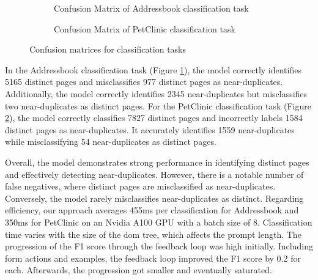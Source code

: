         \begin{figure}[ht]
          \centering
          \begin{subfigure}[b]{0.48\textwidth}
            
            \caption{Confusion Matrix of Addressbook classification task}
            \label{fig:conv_address}
          \end{subfigure}
          \hfill
          \begin{subfigure}[b]{0.48\textwidth}
            
            \caption{Confusion Matrix of PetClinic classification task}
            \label{fig:conf_pet}
          \end{subfigure}
          \caption{Confusion matrices for classification tasks}
          \label{fig:both_matrices}
        \end{figure}

        In the Addressbook classification task (Figure \ref{fig:conv_address}), the model correctly identifies 5165 distinct pages and misclassifies 977 distinct pages as near-duplicates. Additionally, the model correctly identifies 2345 near-duplicates but misclassifies two near-duplicates as distinct pages. For the PetClinic classification task (Figure \ref{fig:conf_pet}), the model correctly classifies 7827 distinct pages and incorrectly labels 1584 distinct pages as near-duplicates. It accurately identifies 1559 near-duplicates while misclassifying 54 near-duplicates as distinct pages.

        Overall, the model demonstrates strong performance in identifying distinct pages and effectively detecting near-duplicates. However, there is a notable number of false negatives, where distinct pages are misclassified as near-duplicates. Conversely, the model rarely misclassifies near-duplicates as distinct. Regarding efficiency, our approach averages 455ms per classification for Addressbook and 350ms for PetClinic on an Nvidia A100 GPU with a batch size of 8. Classification time varies with the size of the \ac{dom} tree, which affects the prompt length. The progression of the F1 score through the feedback loop was high initially. Including form actions and examples, the feedback loop improved the F1 score by 0.2 for each. Afterwards, the progression got smaller and eventually saturated.

        